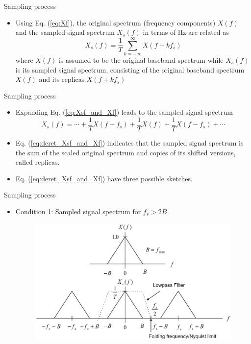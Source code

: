 \documentclass[pdflatex,compress,mathserif]{beamer}
\begin{document}
\begin{frame}{Sampling process}
    \begin{itemize}
        \item Using Eq. (\ref{eq:Xf}), the original spectrum (frequency components) $X(f)$ and the sampled signal spectrum $X_s(f)$ in terms of Hz are related as
        \begin{equation}
            X_s(f) = \frac{1}{T} \sum_{k = -\infty}^{\infty} X(f - kf_s)
            \label{eq:Xsf_and_Xf}
        \end{equation}
        where $X(f)$ is assumed to be the original baseband spectrum while $X_s(f)$ is its sampled signal spectrum, consisting of the original baseband spectrum $X(f)$ and its replicas $X(f\pm kf_s)$
    \end{itemize}
\end{frame}

\begin{frame}{Sampling process}
    \begin{itemize}
        \item Expanding Eq. (\ref{eq:Xsf_and_Xf}) leads to the sampled signal spectrum
        \begin{equation}
            X_s(f) = \cdots + \frac{1}{T}X(f+f_s) + \frac{1}{T}X(f) + \frac{1}{T}X(f-f_s) + \cdots
            \label{eq:deret_Xsf_and_Xf}
        \end{equation}
        \item Eq. (\ref{eq:deret_Xsf_and_Xf}) indicates that the sampled signal spectrum is the sum of the scaled original spectrum and
        copies of its shifted versions, called replicas.
        \item Eq. (\ref{eq:deret_Xsf_and_Xf}) have three possible sketches.
    \end{itemize}
\end{frame}

\begin{frame}{Sampling process}
    \begin{itemize}
        \item Condition 1: Sampled signal spectrum for $f_s > 2B$
        \begin{figure}
            \includegraphics[width=0.9\linewidth]{./img/img09}
            \label{img:09}
        \end{figure}
    \end{itemize}
\end{frame}
\end{document}
